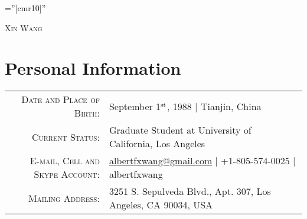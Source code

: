\documentclass[letterpaper,10pt]{article}
\begin{document}
\pagestyle{empty}    %
\font\fb=''[cmr10]'' %

\par{\centering
  {\huge \textsc{Xin Wang}}
\par}

\section{Personal Information}
\begin{tabular}{rl}
    \textsc{Date and Place of Birth:}       & September 1$^{\rm st}$, 1988  |  Tianjin, China \\
    \textsc{Current Status:}  & Graduate Student at University of California, Los Angeles \\
    \textsc{E-mail, Cell and Skype Account:}  & \href{mailto:albertfxwang@gmail.com}{albertfxwang@gmail.com}  |  +1-805-574-0025  |  albertfxwang \\
    \textsc{Mailing Address:} & 3251 S. Sepulveda Blvd., Apt. 307, Los Angeles, CA 90034, USA \\
\end{tabular}


\end{document}
